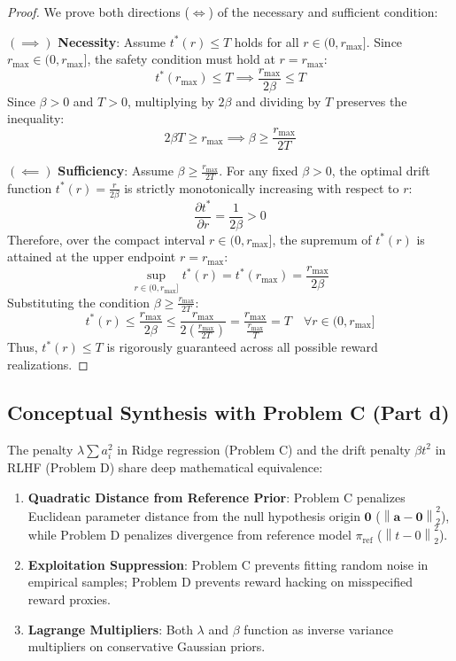 \documentclass[11pt,a4paper]{article}
\theoremstyle{definition}
\theoremstyle{plain}
\theoremstyle{remark}
\newcommand{\norm}[1]{\left\lVert#1\right\rVert}
\begin{document}
\begin{proof}
We prove both directions ($\iff$) of the necessary and sufficient condition:

$(\implies)$ \textbf{Necessity}: Assume $t^*(r) \le T$ holds for all $r \in (0, r_{\max}]$. Since $r_{\max} \in (0, r_{\max}]$, the safety condition must hold at $r = r_{\max}$:
\begin{equation}
t^*(r_{\max}) \le T \implies \frac{r_{\max}}{2\beta} \le T
\end{equation}
Since $\beta > 0$ and $T > 0$, multiplying by $2\beta$ and dividing by $T$ preserves the inequality:
\begin{equation}
2\beta T \ge r_{\max} \implies \beta \ge \frac{r_{\max}}{2T}
\end{equation}

$(\impliedby)$ \textbf{Sufficiency}: Assume $\beta \ge \frac{r_{\max}}{2T}$. For any fixed $\beta > 0$, the optimal drift function $t^*(r) = \frac{r}{2\beta}$ is strictly monotonically increasing with respect to $r$:
\begin{equation}
\frac{\partial t^*}{\partial r} = \frac{1}{2\beta} > 0
\end{equation}
Therefore, over the compact interval $r \in (0, r_{\max}]$, the supremum of $t^*(r)$ is attained at the upper endpoint $r = r_{\max}$:
\begin{equation}
\sup_{r \in (0, r_{\max}]} t^*(r) = t^*(r_{\max}) = \frac{r_{\max}}{2\beta}
\end{equation}
Substituting the condition $\beta \ge \frac{r_{\max}}{2T}$:
\begin{equation}
t^*(r) \le \frac{r_{\max}}{2\beta} \le \frac{r_{\max}}{2\left(\frac{r_{\max}}{2T}\right)} = \frac{r_{\max}}{\frac{r_{\max}}{T}} = T \quad \forall r \in (0, r_{\max}]
\end{equation}
Thus, $t^*(r) \le T$ is rigorously guaranteed across all possible reward realizations.
\end{proof}

\subsection{Conceptual Synthesis with Problem C (Part d)}
The penalty $\lambda \sum a_i^2$ in Ridge regression (Problem C) and the drift penalty $\beta t^2$ in RLHF (Problem D) share deep mathematical equivalence:
\begin{enumerate}[noitemsep]
    \item \textbf{Quadratic Distance from Reference Prior}: Problem C penalizes Euclidean parameter distance from the null hypothesis origin $\mathbf{0}$ ($\norm{\mathbf{a} - \mathbf{0}}_2^2$), while Problem D penalizes divergence from reference model $\pi_{\text{ref}}$ ($\norm{t - 0}_2^2$).
    \item \textbf{Exploitation Suppression}: Problem C prevents fitting random noise in empirical samples; Problem D prevents reward hacking on misspecified reward proxies.
    \item \textbf{Lagrange Multipliers}: Both $\lambda$ and $\beta$ function as inverse variance multipliers on conservative Gaussian priors.
\end{enumerate}
\end{document}
